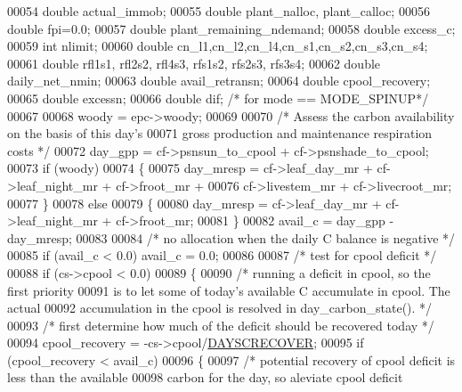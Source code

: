 \begin{DoxyCode}
00054     \textcolor{keywordtype}{double} actual\_immob;
00055     \textcolor{keywordtype}{double} plant\_nalloc, plant\_calloc;
00056     \textcolor{keywordtype}{double} fpi=0.0;
00057     \textcolor{keywordtype}{double} plant\_remaining\_ndemand;
00058     \textcolor{keywordtype}{double} excess\_c;
00059     \textcolor{keywordtype}{int} nlimit;
00060     \textcolor{keywordtype}{double} cn\_l1,cn\_l2,cn\_l4,cn\_s1,cn\_s2,cn\_s3,cn\_s4;
00061     \textcolor{keywordtype}{double} rfl1s1, rfl2s2, rfl4s3, rfs1s2, rfs2s3, rfs3s4;
00062     \textcolor{keywordtype}{double} daily\_net\_nmin;
00063     \textcolor{keywordtype}{double} avail\_retransn;
00064     \textcolor{keywordtype}{double} cpool\_recovery;
00065     \textcolor{keywordtype}{double} excessn;
00066     \textcolor{keywordtype}{double} dif; \textcolor{comment}{/* for mode == MODE\_SPINUP*/}
00067     
00068     woody = epc->woody;
00069     
00070     \textcolor{comment}{/* Assess the carbon availability on the basis of this day's}
00071 \textcolor{comment}{    gross production and maintenance respiration costs */}
00072     day\_gpp = cf->psnsun\_to\_cpool + cf->psnshade\_to\_cpool;
00073     \textcolor{keywordflow}{if} (woody)
00074     \{
00075         day\_mresp = cf->leaf\_day\_mr + cf->leaf\_night\_mr + cf->froot\_mr + 
00076             cf->livestem\_mr + cf->livecroot\_mr;
00077     \}
00078     \textcolor{keywordflow}{else}
00079     \{
00080         day\_mresp = cf->leaf\_day\_mr + cf->leaf\_night\_mr + cf->froot\_mr;
00081     \}
00082     avail\_c = day\_gpp - day\_mresp;
00083     
00084     \textcolor{comment}{/* no allocation when the daily C balance is negative */}
00085     \textcolor{keywordflow}{if} (avail\_c < 0.0) avail\_c = 0.0;
00086 
00087     \textcolor{comment}{/* test for cpool deficit */}
00088     \textcolor{keywordflow}{if} (cs->cpool < 0.0)
00089     \{
00090         \textcolor{comment}{/* running a deficit in cpool, so the first priority}
00091 \textcolor{comment}{        is to let some of today's available C accumulate in cpool.  The actual}
00092 \textcolor{comment}{        accumulation in the cpool is resolved in day\_carbon\_state(). */}
00093         \textcolor{comment}{/* first determine how much of the deficit should be recovered today */}
00094         cpool\_recovery = -cs->cpool/\hyperlink{daily__allocation_8c_adb2b35cde4b81275d96f50e4dc6714f5}{DAYSCRECOVER};
00095         \textcolor{keywordflow}{if} (cpool\_recovery < avail\_c)
00096         \{
00097             \textcolor{comment}{/* potential recovery of cpool deficit is less than the available}
00098 \textcolor{comment}{            carbon for the day, so aleviate cpool deficit}

\end{DoxyCode}
